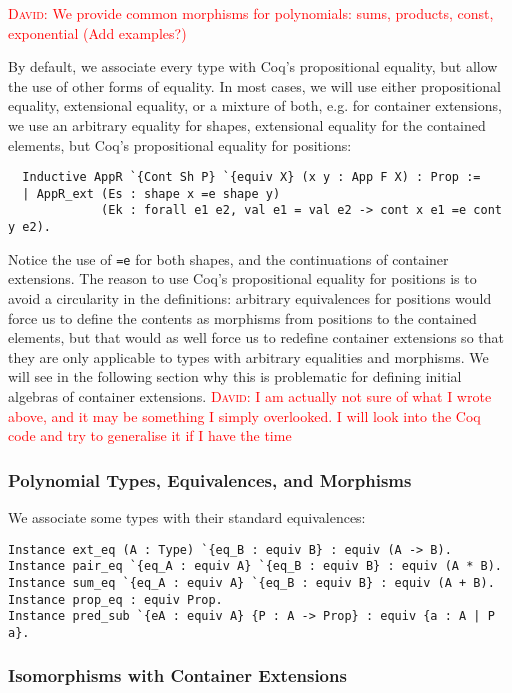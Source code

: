 \documentclass[a4paper, UKenglish, cleveref, autoref, thm-restate]{lipics-v2021}
\newcommand{\dcas}[1]{\textcolor{red}{\textsc{David}: #1}}
\begin{document}
\dcas{We provide common morphisms for polynomials: sums, products, const,
exponential (Add examples?)}

By default, we associate every type with Coq's propositional equality, but allow
the use of other forms of equality. In most cases, we will use either
propositional equality, extensional equality, or a mixture of both, e.g. for
container extensions, we use an arbitrary equality for shapes, extensional
equality for the contained elements, but Coq's propositional equality for
positions:
\begin{verbatim}
  Inductive AppR `{Cont Sh P} `{equiv X} (x y : App F X) : Prop :=
  | AppR_ext (Es : shape x =e shape y)
             (Ek : forall e1 e2, val e1 = val e2 -> cont x e1 =e cont y e2).
\end{verbatim}
Notice the use of \texttt{=e} for both shapes, and the continuations
of container extensions. 
The reason to use Coq's propositional equality for positions is to avoid a
circularity in the definitions: arbitrary equivalences for positions would
force us to define the contents as morphisms from positions to the contained
elements, but that would as well force us to redefine container extensions so
that they are only applicable to types with arbitrary equalities and morphisms.
We will see in the following section why this is problematic for defining
initial algebras of container extensions.
\dcas{I am actually not sure of what I wrote above, and it may be something I
simply overlooked. I will look into the Coq code and try to generalise it if I
have the time}

\subsubsection{Polynomial Types, Equivalences, and Morphisms}
We associate some types with their standard equivalences:
\begin{verbatim}
Instance ext_eq (A : Type) `{eq_B : equiv B} : equiv (A -> B).
Instance pair_eq `{eq_A : equiv A} `{eq_B : equiv B} : equiv (A * B).
Instance sum_eq `{eq_A : equiv A} `{eq_B : equiv B} : equiv (A + B).
Instance prop_eq : equiv Prop.
Instance pred_sub `{eA : equiv A} {P : A -> Prop} : equiv {a : A | P a}.
\end{verbatim}

\subsubsection{Isomorphisms with Container Extensions}
\end{document}
